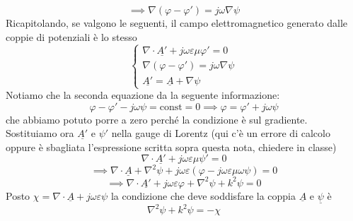 \documentclass{book}
\begin{document}
            \begin{equation}
                \implies \nabla (\varphi - \varphi ') = j \omega \nabla \psi 
            \end{equation}
            Ricapitolando, se valgono le seguenti, il campo elettromagnetico generato dalle coppie di potenziali è lo stesso
            \begin{equation}
                \begin{cases}
                \nabla \cdot \underline{A'}+j \omega \varepsilon \mu \varphi ' = 0 \\
                \nabla (\varphi - \varphi ') = j \omega \nabla \psi \\
                \underline{A'} = \underline{A} +\nabla \psi  
                \end{cases}
            \end{equation}
            Notiamo che la seconda equazione da la seguente informazione:
            \begin{equation}
                \varphi - \varphi ' -j\omega \psi = \textrm{const} = 0 \implies \varphi = \varphi ' + j \omega \psi
            \end{equation}
            che abbiamo potuto porre a zero perché la condizione è sul gradiente. \\
            Sostituiamo ora $\underline{A'}$ e $\psi '$ nella gauge di Lorentz (qui c'è un errore di calcolo oppure è sbagliata l'espressione scritta sopra questa nota, chiedere in classe)
            \begin{equation}
            \nabla \cdot \underline{A'}+j \omega \varepsilon \mu \psi ' = 0
            \end{equation}
            \begin{equation}
                \implies \nabla \cdot \underline{A} + \nabla ^{2}\psi + j \omega \varepsilon (\varphi - j \omega \varepsilon \mu \omega \psi) = 0
            \end{equation}
            \begin{equation}
                \implies \nabla \cdot \underline{A'} + j \omega \varepsilon \varphi + \nabla ^{2} \psi + k^{2} \psi = 0
            \end{equation}
            Posto $\chi = \nabla \cdot \underline{A}+j \omega \varepsilon \psi$ la condizione che deve soddisfare la coppia $\underline{A}$ e $\underline{\psi}$ è
            \begin{equation}
                \nabla ^{2} \psi + k^{2} \psi = - \chi     
            \end{equation}
\end{document}
